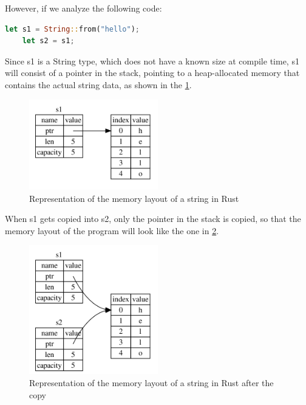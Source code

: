 However, if we analyze the following code:

\begin{lstlisting}[language=Rust]
    let s1 = String::from("hello");
    let s2 = s1;
\end{lstlisting}

Since s1 is a String type, which does not have a known size at compile time, s1 will consist of a pointer in the stack, pointing to a heap-allocated memory that contains the actual string data, as shown in the \cref{fig:string-memory-rep}.

\begin{figure}[h]
    \centering
    \includegraphics[width=0.5\textwidth]{figures/string-memory-rep.png}
    \caption{Representation of the memory layout of a string in Rust}
    \label{fig:string-memory-rep}
\end{figure}

When s1 gets copied into s2, only the pointer in the stack is copied, so that the memory layout of the program will look like the one in \cref{fig:string-memory-rep2}.

\begin{figure}[h]
    \centering
    \includegraphics[width=0.5\textwidth]{figures/string-memory-rep-2.png}
    \caption{Representation of the memory layout of a string in Rust after the copy}
    \label{fig:string-memory-rep2}
\end{figure}

